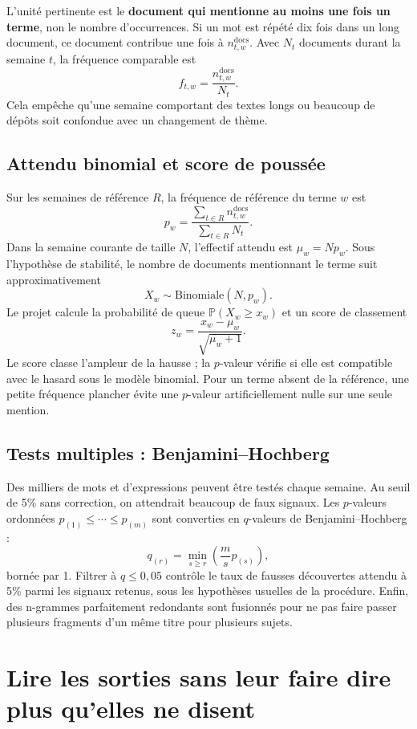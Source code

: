 \documentclass[11pt,a4paper]{article}
\newcommand{\Pp}{\mathbb{P}}
\begin{document}
L'unité pertinente est le \textbf{document qui mentionne au moins une fois un
terme}, non le nombre d'occurrences. Si un mot est répété dix fois dans un long
document, ce document contribue une fois à $n_{t,w}^{\mathrm{docs}}$. Avec
$N_t$ documents durant la semaine $t$, la fréquence comparable est
\[
 f_{t,w}=\frac{n_{t,w}^{\mathrm{docs}}}{N_t}.
\]
Cela empêche qu'une semaine comportant des textes longs ou beaucoup de dépôts
soit confondue avec un changement de thème.

\subsection{Attendu binomial et score de poussée}

Sur les semaines de référence $R$, la fréquence de référence du terme $w$ est
\[
 p_w=\frac{\sum_{t\in R}n_{t,w}^{\mathrm{docs}}}{\sum_{t\in R}N_t}.
\]
Dans la semaine courante de taille $N$, l'effectif attendu est
$\mu_w=Np_w$. Sous l'hypothèse de stabilité, le nombre de documents mentionnant
le terme suit approximativement
\[
 X_w\sim\mathrm{Binomiale}(N,p_w).
\]
Le projet calcule la probabilité de queue $\Pp(X_w\geq x_w)$ et un score de
classement
\[
 z_w=\frac{x_w-\mu_w}{\sqrt{\mu_w+1}}.
\]
Le score classe l'ampleur de la hausse ; la $p$-valeur vérifie si elle est
compatible avec le hasard sous le modèle binomial. Pour un terme absent de la
référence, une petite fréquence plancher évite une $p$-valeur artificiellement
nulle sur une seule mention.

\subsection{Tests multiples : Benjamini--Hochberg}

Des milliers de mots et d'expressions peuvent être testés chaque semaine. Au
seuil de 5\% sans correction, on attendrait beaucoup de faux signaux. Les
$p$-valeurs ordonnées $p_{(1)}\leq\cdots\leq p_{(m)}$ sont converties en
$q$-valeurs de Benjamini--Hochberg :
\[
 q_{(r)}=\min_{s\geq r}\left(\frac{m}{s}p_{(s)}\right),
\]
bornée par 1. Filtrer à $q\leq0{,}05$ contrôle le taux de fausses découvertes
attendu à 5\% parmi les signaux retenus, sous les hypothèses usuelles de la
procédure. Enfin, des n-grammes parfaitement redondants sont fusionnés pour ne
pas faire passer plusieurs fragments d'un même titre pour plusieurs sujets.

\section{Lire les sorties sans leur faire dire plus qu'elles ne disent}\label{sec:lire}
\end{document}
